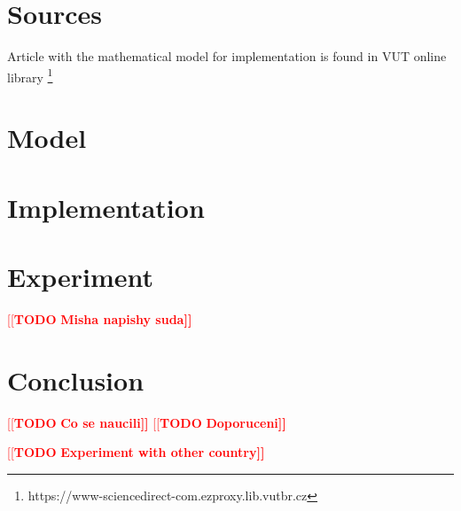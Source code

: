 \documentclass[12pt,a4paper]{article}
\newcommand{\todo}[1]{\textcolor{red}{[[\textbf{TODO} \textbf{#1]]}}}
\begin{document}
    \section{Sources}
    Article with the mathematical model \cite{article} for implementation is 
    found in VUT online library \footnote{https://www-sciencedirect-com.ezproxy.lib.vutbr.cz}
    
    \section{Model}
    \section{Implementation}
    \section{Experiment}
    \todo{Misha napishy suda}
    \section{Conclusion}
    \todo{Co se naucili}
    \todo{Doporuceni}

    \todo{Experiment with other country}
    \clearpage
	
	
\end{document}
